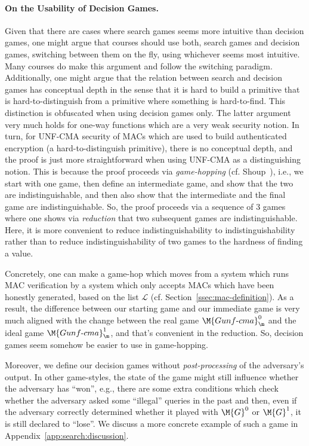 \paragraph{On the Usability of Decision Games.} Given that there are cases where search games seems more intuitive than decision games, one might argue that courses should use both, search games and decision games, switching between them on the fly, using whichever seems most intuitive. Many courses do make this argument and follow the switching paradigm. Additionally, one might argue that the relation between search and decision games has conceptual depth in the sense that it is hard to build a primitive that is hard-to-distinguish from a primitive where something is hard-to-find. This distinction is obfuscated when using decision games only. The latter argument very much holds for one-way functions which are a very weak security notion. In turn, for UNF-CMA security of MACs which are used to build authenticated encryption (a hard-to-distinguish primitive), there is no conceptual depth, and the proof is just more straightforward when using UNF-CMA as a distinguishing notion. This is because the proof proceeds via
\emph{game-hopping} (cf. Shoup~\cite{Shoup04}), i.e., we start with one game, then define an intermediate game, and show that the two are indistinguishable, and then also show that the intermediate and the final game are indistinguishable. So, the proof proceeds via a sequence of 3 games where one shows via \emph{reduction} that two subsequent games are indistinguishable. Here, it is more convenient to reduce indistinguishability to indistinguishability rather than to reduce indistinguishability of two games to the hardness of finding a value.

Concretely, one can make a game-hop which moves from a system which runs MAC verification by a system which only accepts MACs which have been honestly generated, based on the list $\mathcal{L}$ (cf. Section~\ref{ssec:mac-definition}). As a result, the
difference between our starting game and our immediate game is very much aligned with the change between the real game $\M{Gunf\text{-}cma}^0_\m$ and the ideal game $\M{Gunf\text{-}cma}^1_\m$, and that's convenient in the reduction. So, decision games seem somehow be easier to use in game-hopping.

Moreover, we define our decision games without \emph{post-processing} of the adversary's output. In other game-styles, the state
of the game might still influence whether the adversary has ``won'', e.g., there are some extra conditions which check whether the adversary asked some ``illegal'' queries in the past and then, even if the adversary correctly determined whether it played with $\M{G}^0$ or  $\M{G}^1$, it is still declared to ``lose''. We discuss a more concrete example of such a game in Appendix~\ref{app:search:discussion}.

